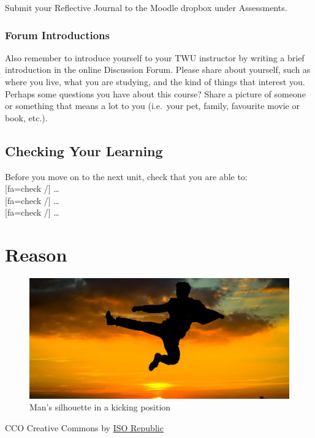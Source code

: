 \documentclass[
]{book}
\begin{document}
Submit your Reflective Journal to the Moodle dropbox under Assessments.

\hypertarget{forum-introductions}{%
\subsection{Forum Introductions}\label{forum-introductions}}

Also remember to introduce yourself to your TWU instructor by writing a brief introduction in the online Discussion Forum. Please share about yourself, such as where you live, what you are studying, and the kind of things that interest you. Perhaps some questions you have about this course? Share a picture of someone or something that means a lot to you (i.e.~your pet, family, favourite movie or book, etc.).

\hypertarget{checking-your-learning}{%
\section{Checking Your Learning}\label{checking-your-learning}}

Before you move on to the next unit, check that you are able to:\\
{[}fa=check /{]} \ldots{}\\
{[}fa=check /{]} \ldots{}\\
{[}fa=check /{]} \ldots{}

\hypertarget{reason}{%
\chapter{Reason}\label{reason}}

\begin{figure}
\centering
\includegraphics{assets/u2/Unit2Overview.jpg}
\caption{Man's silhouette in a kicking position}
\end{figure}

CCO Creative Commons by \href{https://isorepublic.com/photo/flying-kick/}{ISO Republic}
\end{document}
